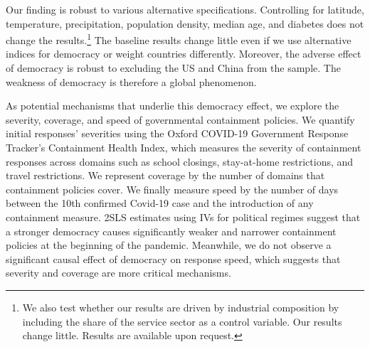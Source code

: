 
Our finding is robust to various alternative specifications. Controlling for latitude, temperature, precipitation, population density, median age, and diabetes does not change the results.\footnote{We also test whether our results are driven by industrial composition by including the share of the service sector as a control variable. Our results change little. Results are available upon request.} 
The baseline results change little even if we use alternative indices for democracy or weight countries differently. Moreover, the adverse effect of democracy is robust to excluding the US and China from the sample. The weakness of democracy is therefore a global phenomenon. 

As potential mechanisms that underlie this democracy effect, we explore the severity, coverage, and speed of governmental containment policies. We quantify initial responses' severities using the Oxford COVID-19 Government Response Tracker's Containment Health Index, which measures the severity of containment responses across domains such as school closings, stay-at-home restrictions, and travel restrictions. We represent coverage by the number of domains that containment policies cover. We finally measure speed by the number of days between the 10th confirmed Covid-19 case and the introduction of any containment measure. 2SLS estimates using IVs for political regimes suggest that a stronger democracy causes significantly weaker and narrower containment policies at the beginning of the pandemic. Meanwhile, we do not observe a significant causal effect of democracy on response speed, which suggests that severity and coverage are more critical mechanisms. \\

